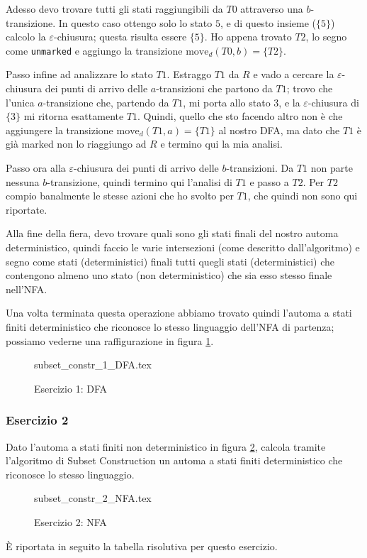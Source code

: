 \documentclass[class=book, crop=false, oneside, 12pt]{standalone}
\begin{document}
Adesso devo trovare tutti gli stati raggiungibili da \(T0\) attraverso una \(b\)-transizione. In questo caso ottengo solo lo stato \(5\), e di questo insieme (\(\{5\}\)) calcolo la \(\varepsilon\)-chiusura; questa risulta essere \(\{5\}\). Ho appena trovato \(T2\), lo segno come \texttt{unmarked} e aggiungo la transizione \(\textrm{move}_d(T0, b)=\{T2\}\).

Passo infine ad analizzare lo stato \(T1\). Estraggo \(T1\) da \(R\) e vado a cercare la \(\varepsilon\)-chiusura dei punti di arrivo delle \(a\)-transizioni che partono da \(T1\); trovo che l'unica \(a\)-transizione che, partendo da \(T1\), mi porta allo stato \(3\), e la \(\varepsilon\)-chiusura di \(\{3\}\) mi ritorna esattamente \(T1\). Quindi, quello che sto facendo altro non è che aggiungere la transizione \(\textrm{move}_d(T1, a)=\{T1\}\) al nostro DFA, ma dato che \(T1\) è già marked non lo riaggiungo ad \(R\) e termino qui la mia analisi.

Passo ora alla \(\varepsilon\)-chiusura dei punti di arrivo delle \(b\)-transizioni. Da \(T1\) non parte nessuna \(b\)-transizione, quindi termino qui l'analisi di \(T1\) e passo a \(T2\).
Per \(T2\) compio banalmente le stesse azioni che ho svolto per \(T1\), che quindi non sono qui riportate.

Alla fine della fiera, devo trovare quali sono gli stati finali del nostro automa deterministico, quindi faccio le varie intersezioni (come descritto dall'algoritmo) e segno come stati (deterministici) finali tutti quegli stati (deterministici) che contengono almeno uno stato (non deterministico) che sia esso stesso finale nell'NFA.

Una volta terminata questa operazione abbiamo trovato quindi l’automa a stati finiti deterministico che riconosce lo stesso linguaggio dell’NFA di partenza; possiamo vederne una raffigurazione in figura \ref{sol_sc_1}.
\begin{figure}[H]
    \centering
    {subset_constr_1_DFA.tex}
    \caption{Esercizio 1: DFA}
    \label{sol_sc_1}
\end{figure}


\subsubsection*{Esercizio 2}
Dato l'automa a stati finiti non deterministico in figura \ref{es_sc_2}, calcola tramite l'algoritmo di Subset Construction un automa a stati finiti deterministico che riconosce lo stesso linguaggio.
\begin{figure}[H]
    \centering
    {subset_constr_2_NFA.tex}
    \caption{Esercizio 2: NFA}
    \label{es_sc_2}
\end{figure}
È riportata in seguito la tabella risolutiva per questo esercizio.\\
\end{document}
